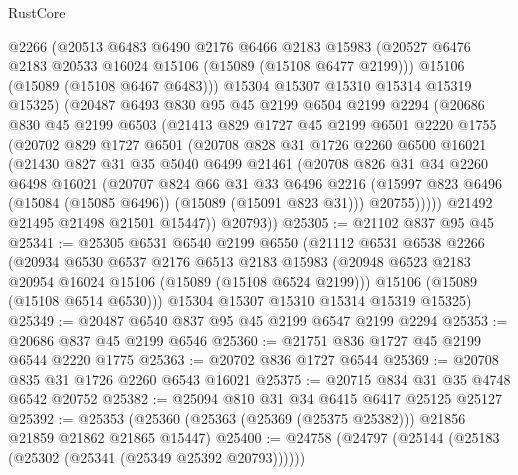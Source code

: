\begin{lexlean}{RustCore}
\begin{coremodule}
        @2266
        (@20513
          @6483
          @6490
          @2176
          @6466
          @2183
          @15983
          (@20527 @6476 @2183 @20533 @16024 @15106 (@15089 (@15108 @6477 @2199)))
          @15106
          (@15089 (@15108 @6467 @6483)))
        @15304
        @15307
        @15310
        @15314
        @15319
        @15325)
      (@20487
        @6493
        @830
        @95
        @45
        @2199
        @6504
        @2199
        @2294
        (@20686
          @830
          @45
          @2199
          @6503
          (@21413
            @829
            @1727
            @45
            @2199
            @6501
            @2220
            @1755
            (@20702
              @829
              @1727
              @6501
              (@20708
                @828
                @31
                @1726
                @2260
                @6500
                @16021
                (@21430
                  @827
                  @31
                  @35
                  @5040
                  @6499
                  @21461
                  (@20708
                    @826
                    @31
                    @34
                    @2260
                    @6498
                    @16021
                    (@20707
                      @824
                      @66
                      @31
                      @33
                      @6496
                      @2216
                      (@15997 @823 @6496 (@15084 (@15085 @6496)) (@15089 (@15091 @823 @31)))
                      @20755)))))
            @21492
            @21495
            @21498
            @21501
            @15447))
        @20793))
@25305 := @21102 @837 @95 @45
@25341 := @25305
    @6531
    @6540
    @2199
    @6550
    (@21112
      @6531
      @6538
      @2266
      (@20934
        @6530
        @6537
        @2176
        @6513
        @2183
        @15983
        (@20948 @6523 @2183 @20954 @16024 @15106 (@15089 (@15108 @6524 @2199)))
        @15106
        (@15089 (@15108 @6514 @6530)))
      @15304
      @15307
      @15310
      @15314
      @15319
      @15325)
@25349 := @20487 @6540 @837 @95 @45 @2199 @6547 @2199 @2294
@25353 := @20686 @837 @45 @2199 @6546
@25360 := @21751 @836 @1727 @45 @2199 @6544 @2220 @1775
@25363 := @20702 @836 @1727 @6544
@25369 := @20708 @835 @31 @1726 @2260 @6543 @16021
@25375 := @20715 @834 @31 @35 @4748 @6542 @20752
@25382 := @25094 @810 @31 @34 @6415 @6417 @25125 @25127
@25392 := @25353 (@25360 (@25363 (@25369 (@25375 @25382))) @21856 @21859 @21862 @21865 @15447)
@25400 := @24758 (@24797 (@25144 (@25183 (@25302 (@25341 (@25349 @25392 @20793))))))

\end{coremodule}
\end{lexlean}
